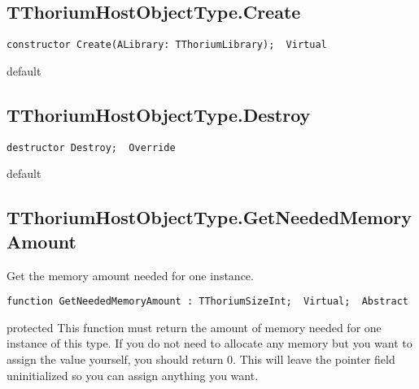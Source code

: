 \subsection{TThoriumHostObjectType.Create}
\label{thoriumcorepkg:thorium:tthoriumhostobjecttype:create}
\begin{FPCList}
\Declaration 

\begin{verbatim}
constructor Create(ALibrary: TThoriumLibrary);  Virtual
\end{verbatim}
\Visibility
default
\end{FPCList}
\subsection{TThoriumHostObjectType.Destroy}
\label{thoriumcorepkg:thorium:tthoriumhostobjecttype:destroy}
\begin{FPCList}
\Declaration 

\begin{verbatim}
destructor Destroy;  Override
\end{verbatim}
\Visibility
default
\end{FPCList}
\subsection{TThoriumHostObjectType.GetNeededMemoryAmount}
\label{thoriumcorepkg:thorium:tthoriumhostobjecttype:getneededmemoryamount}
\begin{FPCList}
\Synopsis
Get the memory amount needed for one instance.\Declaration 

\begin{verbatim}
function GetNeededMemoryAmount : TThoriumSizeInt;  Virtual;  Abstract
\end{verbatim}
\Visibility
protected
\Description
This function must return the amount of memory needed for one instance of this type. If you do not need to allocate any memory but you want to assign the value yourself, you should return 0. This will leave the pointer field uninitialized so you can assign anything you want.\end{FPCList}
